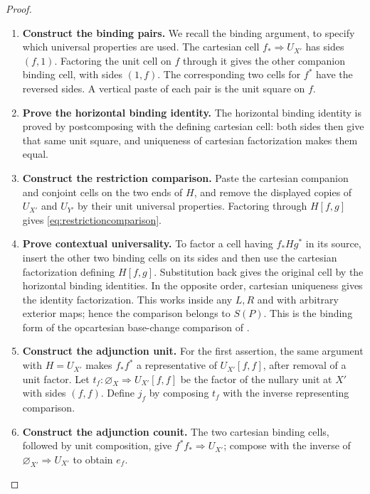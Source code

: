 \documentclass[11pt,reqno]{amsart}
\theoremstyle{plain}
\theoremstyle{definition}
\theoremstyle{remark}
\numberwithin{equation}{section}
\newcommand{\cell}{\mathrel{\Longrightarrow}}
\newcommand{\emp}[1]{\varnothing_{#1}}
\begin{document}
\begin{proof}\leavevmode
\begin{enumerate}
\item \textbf{Construct the binding pairs.} We recall the binding argument, to specify which universal properties are
used. The cartesian cell $f_*\cell U_{X'}$ has sides $(f,1)$.
Factoring the unit cell on $f$ through it gives the other companion
binding cell, with sides $(1,f)$. The corresponding two cells for $f^*$
have the reversed sides. A vertical paste of each pair is the unit square
on $f$.

\item \textbf{Prove the horizontal binding identity.} The horizontal binding identity is proved by postcomposing with
the defining cartesian cell: both sides then give that same unit square,
and uniqueness of cartesian factorization makes them equal.

\item \textbf{Construct the restriction comparison.} Paste the cartesian companion and conjoint cells on the two ends of
$H$, and remove the displayed copies of $U_{X'}$ and $U_{Y'}$ by their
unit universal properties. Factoring through $H[f,g]$ gives
\cref{eq:restrictioncomparison}.

\item \textbf{Prove contextual universality.} To factor a cell having $f_*Hg^*$
in its source, insert the other two binding cells on its sides and then
use the cartesian factorization defining $H[f,g]$. Substitution back gives
the original cell by the horizontal binding identities. In the opposite
order, cartesian uniqueness gives the identity factorization. This works
inside any $L,R$ and with arbitrary exterior maps; hence the comparison
belongs to $S(P)$. This is the binding form of the opcartesian base-change
comparison of \cite[Theorem 7.16]{CruttwellShulman2010}.

\item \textbf{Construct the adjunction unit.} For the first assertion, the same argument with $H=U_{X'}$ makes
$f_*f^*$ a representative of $U_{X'}[f,f]$, after removal of a unit
factor. Let $t_f:\emp X\cell U_{X'}[f,f]$ be the factor of the
nullary unit at $X'$ with sides $(f,f)$. Define $j_f$ by composing
$t_f$ with the inverse representing comparison.

\item \textbf{Construct the adjunction counit.} The two cartesian
binding cells, followed by unit composition, give
$f^*f_*\cell U_{X'}$; compose with the inverse of
$\emp{X'}\cell U_{X'}$ to obtain $e_f$.


\end{enumerate}
\end{proof}
\end{document}
